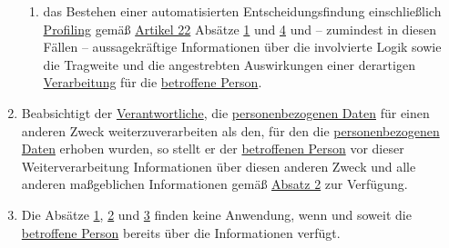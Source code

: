 \begin{enumerate}
\begin{enumerate}
    \item das Bestehen einer automatisierten Entscheidungsfindung einschließlich \hyperref[itm:04-4]
     {Profiling} gemäß \hyperref[ch:22]{Artikel 22} Absätze \hyperref[itm:22-1]{1} und \hyperref[itm:22-4]{4} und --
     zumindest in diesen Fällen -- aussagekräftige Informationen über die involvierte Logik sowie die Tragweite und die
     angestrebten Auswirkungen einer derartigen \hyperref[itm:04-2]{Verarbeitung} für die \hyperref[itm:04-1]
     {betroffene Person}.%
    \label{itm:13-2f}

  \end{enumerate}

  \item Beabsichtigt der \hyperref[itm:04-7]{Verantwortliche}, die \hyperref[itm:04-1]{personenbezogenen Daten} für
   einen anderen Zweck weiterzuverarbeiten als den, für den die \hyperref[itm:04-1]{personenbezogenen Daten} erhoben
   wurden, so stellt er der \hyperref[itm:04-1]{betroffenen Person} vor dieser Weiterverarbeitung Informationen über
   diesen anderen Zweck und alle anderen maßgeblichen Informationen gemäß
   \hyperref[itm:13-2]{Absatz 2} zur Verfügung.%
  \label{itm:13-3}  

  \item Die Absätze \hyperref[itm:13-1]{1}, \hyperref[itm:13-2]{2} und \hyperref[itm:13-3]{3} finden keine Anwendung,
   wenn und soweit die \hyperref[itm:04-1]{betroffene Person} bereits über die Informationen verfügt.%
  \label{itm:13-4}  

\end{enumerate}


